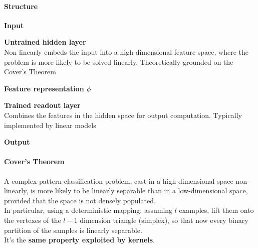 \documentclass[10pt]{report}
\begin{document}
\paragraph{Structure}\begin{list}{}{}
	\item \textbf{Input}
	\item \textbf{Untrained hidden layer}\\
	Non-linearly embeds the input into a high-dimensional feature space, where the problem is more likely to be solved linearly. Theoretically grounded on the Cover's Theorem
	\item \textbf{Feature representation $\phi$}
	\item \textbf{Trained readout layer}\\
	Combines the features in the hidden space for output computation. Typically implemented by linear models
	\item \textbf{Output}
\end{list}
\paragraph{Cover's Theorem} A complex pattern-classification problem, cast in a high-dimensional space non-linearly, is more likely to be linearly separable than in a low-dimensional space, provided that the space is not densely populated.\\
In particular, using a deterministic mapping: assuming $l$ examples, lift them onto the vertexes of the $l-1$ dimension triangle (simplex), so that now every binary partition of the samples is linearly separable.\\
It's the \textbf{same property exploited by kernels}.
\end{document}
